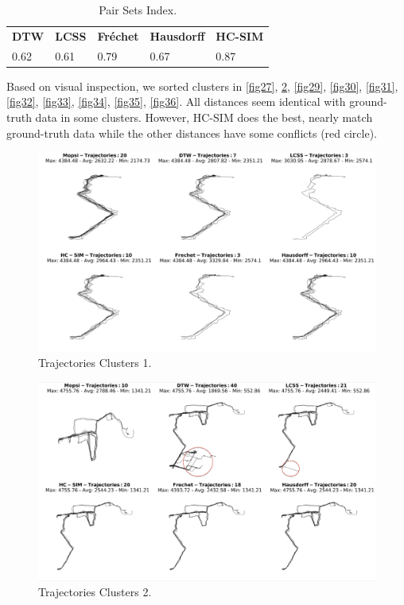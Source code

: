 \documentclass[a4paper, 12pt]{article}
\begin{document}
\begin{table}[htbp!]
    \centering
    \def\arraystretch{1}%
    \caption{Pair Sets Index.}
    \begin{tabular}{|l|l|l|l|l|} 
     \hline
     \textbf{DTW} & \textbf{LCSS} & \textbf{Fréchet} & \textbf{Hausdorff} & \textbf{HC-SIM} \\
     0.62 & 0.61 & 0.79 & 0.67 & 0.87 \\
     \hline
    \end{tabular}
    \label{table:psi}
\end{table}

Based on visual inspection, we sorted clusters in \autoref{fig27}, \ref{fig28}, \ref{fig29}, \ref{fig30}, \ref{fig31}, \ref{fig32}, \ref{fig33}, \ref{fig34}, \ref{fig35}, \ref{fig36}. All distances seem identical with ground-truth data in some clusters. However, HC-SIM does the best, nearly match ground-truth data while the other distances have some conflicts (red circle). 

\begin{figure}[htbp!]
    \centering
    \includegraphics[width=1\textwidth]{Mopsi Clusters 1.png}
    \caption{Trajectories Clusters 1.}
    \label{fig27}
\end{figure}

\begin{figure}[htbp!]
    \centering
    \includegraphics[width=1\textwidth]{Mopsi Clusters 2.png}
    \caption{Trajectories Clusters 2.}
    \label{fig28}
\end{figure}
\end{document}

